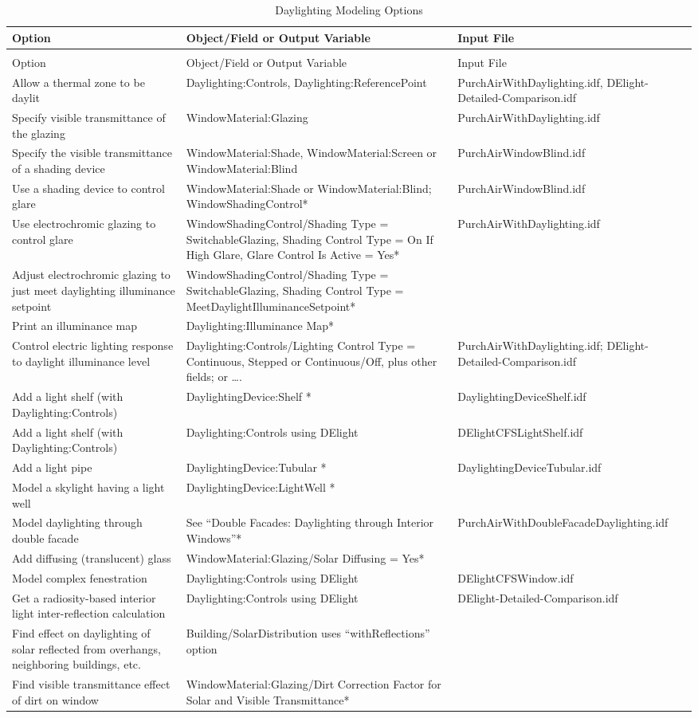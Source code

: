 {\scriptsize
\begin{longtable}[c]{>{\raggedright}p{1.5in}>{\raggedright}p{3.0in}>{\raggedright}p{1.5in}}
\caption{Daylighting Modeling Options \label{table:daylighting-modeling-options}} \tabularnewline
\toprule
Option & Object/Field or Output Variable & Input File \tabularnewline
\midrule
\endfirsthead

\caption[]{Daylighting Modeling Options} \tabularnewline
\toprule
Option & Object/Field or Output Variable & Input File \tabularnewline
\midrule
\endhead

Allow a thermal zone to be daylit & Daylighting:Controls, Daylighting:ReferencePoint & PurchAirWithDaylighting.idf, DElight-Detailed-Comparison.idf \tabularnewline
Specify visible transmittance of the glazing & WindowMaterial:Glazing & PurchAirWithDaylighting.idf \tabularnewline
Specify the visible transmittance of a shading device & WindowMaterial:Shade, WindowMaterial:Screen or WindowMaterial:Blind & PurchAirWindowBlind.idf \tabularnewline
Use a shading device to control glare & WindowMaterial:Shade or WindowMaterial:Blind; WindowShadingControl* & PurchAirWindowBlind.idf \tabularnewline
Use electrochromic glazing to control glare & WindowShadingControl/Shading Type = SwitchableGlazing, Shading Control Type = On If High Glare, Glare Control Is Active = Yes* & PurchAirWithDaylighting.idf \tabularnewline
Adjust electrochromic glazing to just meet daylighting illuminance setpoint & WindowShadingControl/Shading Type = SwitchableGlazing, Shading Control Type = MeetDaylightIlluminanceSetpoint* & ~ \tabularnewline
Print an illuminance map & Daylighting:Illuminance Map* & ~ \tabularnewline
Control electric lighting response to daylight illuminance level & Daylighting:Controls/Lighting Control Type = Continuous, Stepped or Continuous/Off, plus other fields; or …. & PurchAirWithDaylighting.idf; DElight-Detailed-Comparison.idf \tabularnewline
Add a light shelf (with Daylighting:Controls) & DaylightingDevice:Shelf * & DaylightingDeviceShelf.idf \tabularnewline
Add a light shelf (with Daylighting:Controls) & Daylighting:Controls using DElight & DElightCFSLightShelf.idf \tabularnewline
Add a light pipe & DaylightingDevice:Tubular * & DaylightingDeviceTubular.idf \tabularnewline
Model a skylight having a light well & DaylightingDevice:LightWell * & ~ \tabularnewline
Model daylighting through double facade & See “Double Facades: Daylighting through Interior Windows”* & PurchAirWithDoubleFacadeDaylighting.idf \tabularnewline
Add diffusing (translucent) glass & WindowMaterial:Glazing/Solar Diffusing = Yes* & ~ \tabularnewline
Model complex fenestration & Daylighting:Controls using DElight & DElightCFSWindow.idf \tabularnewline
Get a radiosity-based interior light inter-reflection calculation & Daylighting:Controls using DElight & DElight-Detailed-Comparison.idf \tabularnewline
Find effect on daylighting of solar reflected from overhangs, neighboring buildings, etc. & Building/SolarDistribution uses “withReflections” option & ~ \tabularnewline
Find visible transmittance effect of dirt on window & WindowMaterial:Glazing/Dirt Correction Factor for Solar and Visible Transmittance* & ~ \tabularnewline
\bottomrule
\end{longtable}}

